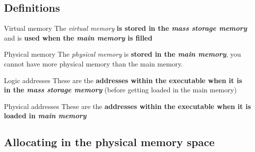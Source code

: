 \documentclass{beamer}[10pt, usepdftitle=false, handout]
\begin{document}
	\subsection{Definitions}
	
	\begin{frame}
	\begin{exampleblock}{Virtual memory}	
	The \textit{virtual memory} \textbf{is stored in the \textit{mass storage memory}} and is \textbf{used when the \textit{main memory} is filled}
	\end{exampleblock}	
	
	\begin{exampleblock}{Physical memory}
	The  \textit{physical memory} is \textbf{stored in the \textit{main memory}}, you cannot have more physical memory than the main memory. \footnotemark[1]
	\end{exampleblock}

	\begin{exampleblock}{Logic addresses}
	These are the \textbf{addresses within the executable when it is in the \textit{mass storage memory}} (before getting loaded in the main memory)
	\end{exampleblock}
	
	\begin{exampleblock}{Physical addresses}
	These are the \textbf{addresses within the executable when it is loaded in \textit{main memory}}
	\end{exampleblock}	
	
	
	\end{frame}	
	
	\subsection{Allocating in the physical memory space}	
		    
\end{document}
